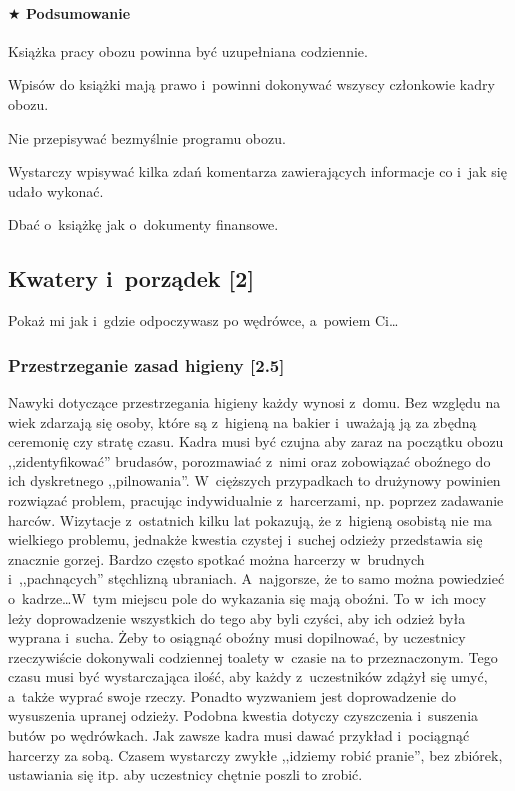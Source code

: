 \documentclass[a5paper,10pt,titlepage,twoside]{article}
\newcommand*{\thecheckbox}{\hss$\Box$} %
\newenvironment*{checklist}
{\list{}{%
\renewcommand*{\makelabel}[1]{\thecheckbox}}}
{\endlist}
\begin{document}
\paragraph{$\bigstar$ Podsumowanie}
\begin{checklist}
\item Książka pracy obozu powinna być uzupełniana codziennie.
\item Wpisów do książki mają prawo i~powinni dokonywać wszyscy członkowie kadry obozu.
\item Nie przepisywać bezmyślnie programu obozu.
\item Wystarczy wpisywać kilka zdań komentarza zawierających informacje co i~jak się udało wykonać.
\item Dbać o~książkę jak o~dokumenty finansowe.
\end{checklist}
\subsection{Kwatery i~porządek [2]}
Pokaż mi jak i~gdzie odpoczywasz po wędrówce, a~powiem Ci\ldots
\subsubsection{Przestrzeganie zasad higieny [2.5]}
Nawyki dotyczące przestrzegania higieny każdy wynosi z~domu. Bez względu na wiek zdarzają się osoby, które są z~higieną na bakier i~uważają ją za zbędną ceremonię czy stratę czasu. Kadra musi być czujna aby zaraz na początku obozu ,,zidentyfikować'' brudasów, porozmawiać z~nimi oraz zobowiązać oboźnego do ich dyskretnego ,,pilnowania''. W~cięższych przypadkach to drużynowy powinien rozwiązać problem, pracując indywidualnie z~harcerzami, np. poprzez zadawanie harców. Wizytacje z~ostatnich kilku lat pokazują, że z~higieną osobistą nie ma wielkiego problemu, jednakże kwestia czystej i~suchej odzieży przedstawia się znacznie gorzej. Bardzo często spotkać można harcerzy w~brudnych i~,,pachnących'' stęchlizną ubraniach. A~najgorsze, że to samo można powiedzieć o~kadrze\ldots W~tym miejscu pole do wykazania się mają oboźni. To w~ich mocy leży doprowadzenie wszystkich do tego aby byli czyści, aby ich odzież była wyprana i~sucha. Żeby to osiągnąć oboźny musi dopilnować, by uczestnicy rzeczywiście dokonywali codziennej toalety w~czasie na to przeznaczonym. Tego czasu musi być wystarczająca ilość, aby każdy z~uczestników zdążył się umyć, a~także wyprać swoje rzeczy. Ponadto wyzwaniem jest doprowadzenie do wysuszenia upranej odzieży. Podobna kwestia dotyczy czyszczenia i~suszenia butów po wędrówkach. Jak zawsze kadra musi dawać przykład i~pociągnąć harcerzy za sobą. Czasem wystarczy zwykłe ,,idziemy robić pranie'', bez zbiórek, ustawiania się itp. aby uczestnicy chętnie poszli to zrobić.
\end{document}
